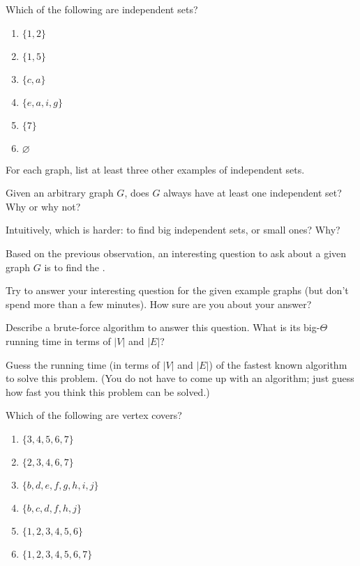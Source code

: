 \documentclass{tufte-handout}
\begin{document}
\begin{questions}
\item \label{q:whichIS} Which of the following are independent sets?
  \begin{enumerate}[label=(\alph*)]
  \item $\{1,2\}$
  \item $\{1,5\}$
  \item $\{c,a\}$
  \item $\{e,a,i,g\}$
  \item $\{7\}$
  \item $\varnothing$
  \end{enumerate}

\item For each graph, list at least three other examples of
  independent sets.

\item Given an arbitrary graph $G$, does $G$ always have at least one
  independent set?  Why or why not?

\item Intuitively, which is harder: to find big independent sets, or
  small ones?  Why?

\item Based on the previous observation, an interesting question to
  ask about a given graph $G$ is to find the \blank.

\item Try to answer your interesting question for the given example
  graphs (but don't spend more than a few minutes).  How sure are you
  about your answer?

\item Describe a brute-force algorithm to answer this question.  What
  is its big-$\Theta$ running time in terms of $|V|$ and $|E|$?

\item Guess the running time (in terms of $|V|$ and $|E|$) of the
  fastest known algorithm to solve this problem. (You do not have to
  come up with an algorithm; just guess how fast you think this
  problem can be solved.)

\item \label{q:whichVC} Which of the following are vertex covers?
  \begin{enumerate}[label=(\alph*)]
  \item $\{3,4,5,6,7\}$
  \item $\{2,3,4,6,7\}$
  \item $\{b,d,e,f,g,h,i,j\}$
  \item $\{b,c,d,f,h,j\}$
  \item $\{1,2,3,4,5,6\}$
  \item $\{1,2,3,4,5,6,7\}$
  \end{enumerate}


\end{questions}
\end{document}
